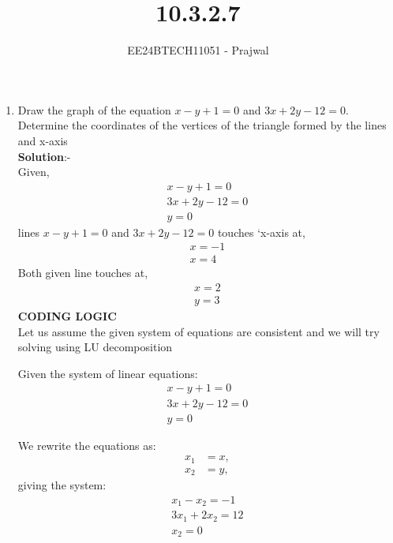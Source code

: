 \documentclass[journal]{IEEEtran}
\numberwithin{equation}{enumi}
\numberwithin{figure}{enumi}
\begin{document}

\title{10.3.2.7}
\author{EE24BTECH11051 - Prajwal}
{\let\newpage\relax\maketitle}
\begin{enumerate}
\item Draw the graph of the equation $x-y+1=0$ and $3x+2y-12=0$. Determine the coordinates of the vertices of the triangle formed by the lines and x-axis\\
\textbf{Solution}:-\\
Given,
\begin{align}
x-y+1=0\\
3x+2y-12=0\\
y=0
\end{align}
lines $x-y+1=0$ and $3x+2y-12=0$ touches `x-axis at,
\begin{align}
    x=-1\\
    x=4
\end{align}
Both given line touches at,
\begin{align}
    x=2\\
    y=3
\end{align}
\textbf{CODING LOGIC}\\


	Let us assume the given system of equations are consistent and we will try solving using LU decomposition
	
	Given the system of linear equations:
	\begin{align}
	x-y+1=0\\
    3x+2y-12=0\\
    y=0
	\end{align}
	
	We rewrite the equations as:
	\begin{align}
		x_1 &= x, \\
        		x_2 &= y,
	\end{align}
	giving the system:
	\begin{align}
	x_1-x_2=-1\\
    3x_1+2x_2=12\\
    x_2=0
	\end{align}
	

\end{enumerate}
\end{document}
